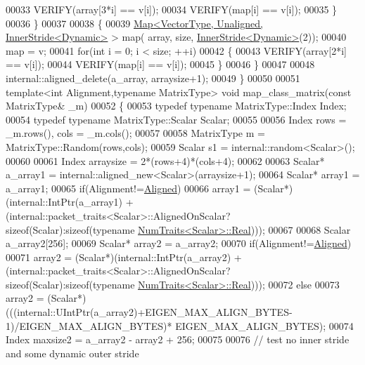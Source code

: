 \begin{DoxyCode}
00033       VERIFY(array[3*i] == v[i]);
00034       VERIFY(map[i] == v[i]);
00035     \}
00036   \}
00037 
00038   \{
00039     \hyperlink{group___core___module_class_eigen_1_1_map}{Map<VectorType, Unaligned, InnerStride<Dynamic>} > map(
      array, size, \hyperlink{class_eigen_1_1_inner_stride}{InnerStride<Dynamic>}(2));
00040     map = v;
00041     \textcolor{keywordflow}{for}(\textcolor{keywordtype}{int} i = 0; i < size; ++i)
00042     \{
00043       VERIFY(array[2*i] == v[i]);
00044       VERIFY(map[i] == v[i]);
00045     \}
00046   \}
00047 
00048   internal::aligned\_delete(a\_array, arraysize+1);
00049 \}
00050 
00051 \textcolor{keyword}{template}<\textcolor{keywordtype}{int} Alignment,\textcolor{keyword}{typename} MatrixType> \textcolor{keywordtype}{void} map\_class\_matrix(\textcolor{keyword}{const} MatrixType& \_m)
00052 \{
00053   \textcolor{keyword}{typedef} \textcolor{keyword}{typename} MatrixType::Index Index;
00054   \textcolor{keyword}{typedef} \textcolor{keyword}{typename} MatrixType::Scalar Scalar;
00055 
00056   Index rows = \_m.rows(), cols = \_m.cols();
00057 
00058   MatrixType m = MatrixType::Random(rows,cols);
00059   Scalar s1 = internal::random<Scalar>();
00060 
00061   Index arraysize = 2*(rows+4)*(cols+4);
00062 
00063   Scalar* a\_array1 = internal::aligned\_new<Scalar>(arraysize+1);
00064   Scalar* array1 = a\_array1;
00065   \textcolor{keywordflow}{if}(Alignment!=\hyperlink{group__enums_gga45fe06e29902b7a2773de05ba27b47a1ad37d4c71425bb286e9b4103830538fbf}{Aligned})
00066     array1 = (Scalar*)(internal::IntPtr(a\_array1) + (internal::packet\_traits<Scalar>::AlignedOnScalar?\textcolor{keyword}{
      sizeof}(Scalar):\textcolor{keyword}{sizeof}(\textcolor{keyword}{typename} \hyperlink{group___core___module_struct_eigen_1_1_num_traits}{NumTraits<Scalar>::Real})));
00067 
00068   Scalar a\_array2[256];
00069   Scalar* array2 = a\_array2;
00070   \textcolor{keywordflow}{if}(Alignment!=\hyperlink{group__enums_gga45fe06e29902b7a2773de05ba27b47a1ad37d4c71425bb286e9b4103830538fbf}{Aligned})
00071     array2 = (Scalar*)(internal::IntPtr(a\_array2) + (internal::packet\_traits<Scalar>::AlignedOnScalar?\textcolor{keyword}{
      sizeof}(Scalar):\textcolor{keyword}{sizeof}(\textcolor{keyword}{typename} \hyperlink{group___core___module_struct_eigen_1_1_num_traits}{NumTraits<Scalar>::Real})));
00072   \textcolor{keywordflow}{else}
00073     array2 = (Scalar*)(((internal::UIntPtr(a\_array2)+EIGEN\_MAX\_ALIGN\_BYTES-1)/EIGEN\_MAX\_ALIGN\_BYTES)*
      EIGEN\_MAX\_ALIGN\_BYTES);
00074   Index maxsize2 = a\_array2 - array2 + 256;
00075   
00076   \textcolor{comment}{// test no inner stride and some dynamic outer stride}

\end{DoxyCode}
